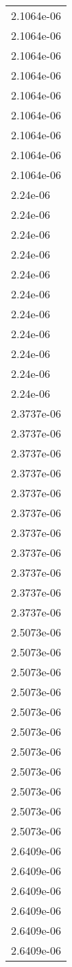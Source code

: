 \begin{tabular}{l}
2.1064e-06 \\ 
2.1064e-06 \\ 
2.1064e-06 \\ 
2.1064e-06 \\ 
2.1064e-06 \\ 
2.1064e-06 \\ 
2.1064e-06 \\ 
2.1064e-06 \\ 
2.1064e-06 \\ 
2.24e-06 \\ 
2.24e-06 \\ 
2.24e-06 \\ 
2.24e-06 \\ 
2.24e-06 \\ 
2.24e-06 \\ 
2.24e-06 \\ 
2.24e-06 \\ 
2.24e-06 \\ 
2.24e-06 \\ 
2.24e-06 \\ 
2.3737e-06 \\ 
2.3737e-06 \\ 
2.3737e-06 \\ 
2.3737e-06 \\ 
2.3737e-06 \\ 
2.3737e-06 \\ 
2.3737e-06 \\ 
2.3737e-06 \\ 
2.3737e-06 \\ 
2.3737e-06 \\ 
2.3737e-06 \\ 
2.5073e-06 \\ 
2.5073e-06 \\ 
2.5073e-06 \\ 
2.5073e-06 \\ 
2.5073e-06 \\ 
2.5073e-06 \\ 
2.5073e-06 \\ 
2.5073e-06 \\ 
2.5073e-06 \\ 
2.5073e-06 \\ 
2.5073e-06 \\ 
2.6409e-06 \\ 
2.6409e-06 \\ 
2.6409e-06 \\ 
2.6409e-06 \\ 
2.6409e-06 \\ 
2.6409e-06 \\ 

\end{tabular}
